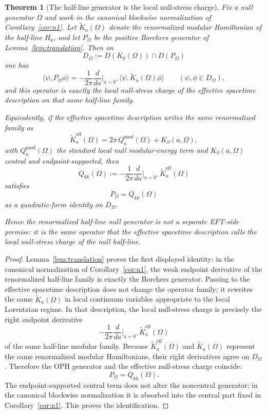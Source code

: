 \documentclass[11pt]{article}
\newtheorem{theorem}{Theorem}[section]
\begin{document}
\begin{theorem}[The half-line generator is the local null-stress charge]\label{thm:stress}
Fix a null generator \(\Omega\) and work in the canonical blockwise normalization of Corollary~\ref{cor:n1}. Let \(\widetilde K_a(\Omega)\) denote the renormalized modular Hamiltonian of the half-line \(H_a\), and let \(P_\Omega\) be the positive Borchers generator of Lemma~\ref{lem:translation}. Then on
\[
D_\Omega:=D(K_0(\Omega))\cap D(P_\Omega)
\]
one has
\[
\langle\psi,P_\Omega\phi\rangle
=
-\frac{1}{2\pi}\frac{d}{da}\Big|_{a=0^+}
\langle\psi,\widetilde K_a(\Omega)\phi\rangle
\qquad (\psi,\phi\in D_\Omega),
\]
and this operator is exactly the local null-stress charge of the effective spacetime description on that same half-line family.

Equivalently, if the effective spacetime description writes the same renormalized family as
\[
\widetilde K^{\mathrm{eff}}_a(\Omega)
=
2\pi\,Q^{\mathrm{mod}}_a(\Omega)+K_{\partial}(a,\Omega),
\]
with \(Q^{\mathrm{mod}}_a(\Omega)\) the standard local null modular-energy term and \(K_{\partial}(a,\Omega)\) central and endpoint-supported, then
\[
Q_{kk}(\Omega)
:=
-\frac{1}{2\pi}\frac{d}{da}\Big|_{a=0^+}\widetilde K^{\mathrm{eff}}_a(\Omega)
\]
satisfies
\[
P_\Omega = Q_{kk}(\Omega)
\]
as a quadratic-form identity on \(D_\Omega\).

Hence the renormalized half-line null generator is not a separate EFT-side premise: it is the same operator that the effective spacetime description calls the local null-stress charge of the null half-line.
\end{theorem}

\begin{proof}
Lemma~\ref{lem:translation} proves the first displayed identity: in the canonical normalization of Corollary~\ref{cor:n1}, the weak endpoint derivative of the renormalized half-line family is exactly the Borchers generator. Passing to the effective spacetime description does not change the operator family; it rewrites the same \(\widetilde K_a(\Omega)\) in local continuum variables appropriate to the local Lorentzian regime. In that description, the local null-stress charge is precisely the right endpoint derivative
\[
-\frac{1}{2\pi}\frac{d}{da}\Big|_{a=0^+}\widetilde K^{\mathrm{eff}}_a(\Omega)
\]
of the same half-line modular family. Because \(\widetilde K^{\mathrm{eff}}_a(\Omega)\) and \(\widetilde K_a(\Omega)\) represent the same renormalized modular Hamiltonians, their right derivatives agree on \(D_\Omega\). Therefore the OPH generator and the effective null-stress charge coincide:
\[
P_\Omega = Q_{kk}(\Omega).
\]
The endpoint-supported central term does not alter the noncentral generator; in the canonical blockwise normalization it is absorbed into the central part fixed in Corollary~\ref{cor:n1}. This proves the identification.
\end{proof}
\end{document}
